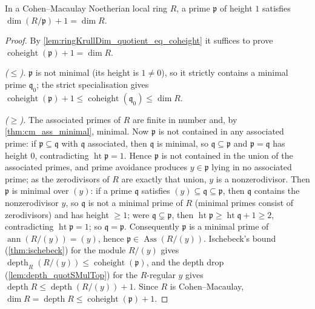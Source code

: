 \begin{theorem}
  \label{thm:cm_height_one}
  \leanok
  In a Cohen--Macaulay Noetherian local ring \(R\), a prime \(\mathfrak p\) of
  height \(1\) satisfies \(\dim(R/\mathfrak p) + 1 = \dim R\).
\end{theorem}
\begin{proof}
  \leanok
  By \ref{lem:ringKrullDim_quotient_eq_coheight} it suffices to prove
  \(\operatorname{coheight}(\mathfrak p) + 1 = \dim R\).

  \emph{(\(\le\)).} \(\mathfrak p\) is not minimal (its height is \(1 \neq 0\)),
  so it strictly contains a minimal prime \(\mathfrak q_0\); the strict
  specialisation gives \(\operatorname{coheight}(\mathfrak p) + 1 \le
  \operatorname{coheight}(\mathfrak q_0) \le \dim R\).

  \emph{(\(\ge\)).} The associated primes of \(R\) are finite in number and, by
  \ref{thm:cm_ass_minimal}, minimal. Now \(\mathfrak p\) is not contained in any
  associated prime: if \(\mathfrak p \subseteq \mathfrak q\) with \(\mathfrak q\)
  associated, then \(\mathfrak q\) is minimal, so \(\mathfrak q \subseteq
  \mathfrak p\) and \(\mathfrak p = \mathfrak q\) has height \(0\), contradicting
  \(\operatorname{ht} \mathfrak p = 1\). Hence \(\mathfrak p\) is not contained in
  the union of the associated primes, and prime avoidance produces
  \(y \in \mathfrak p\) lying in no associated prime; as the zerodivisors of
  \(R\) are exactly that union, \(y\) is a nonzerodivisor. Then \(\mathfrak p\)
  is minimal over \((y)\): if a prime \(\mathfrak q\) satisfies
  \((y) \subseteq \mathfrak q \subseteq \mathfrak p\), then \(\mathfrak q\)
  contains the nonzerodivisor \(y\), so \(\mathfrak q\) is not a minimal prime of
  \(R\) (minimal primes consist of zerodivisors) and has height \(\ge 1\); were
  \(\mathfrak q \subsetneq \mathfrak p\), then \(\operatorname{ht} \mathfrak p \ge
  \operatorname{ht} \mathfrak q + 1 \ge 2\), contradicting \(\operatorname{ht}
  \mathfrak p = 1\); so \(\mathfrak q = \mathfrak p\). Consequently
  \(\mathfrak p\) is a minimal prime of \(\operatorname{ann}(R/(y)) = (y)\), hence
  \(\mathfrak p \in \operatorname{Ass}(R/(y))\). Ischebeck's bound
  (\ref{thm:ischebeck}) for the module \(R/(y)\) gives
  \(\operatorname{depth}_R(R/(y)) \le \operatorname{coheight}(\mathfrak p)\), and
  the depth drop (\ref{lem:depth_quotSMulTop}) for the \(R\)-regular \(y\) gives
  \(\operatorname{depth} R \le \operatorname{depth}(R/(y)) + 1\). Since \(R\) is
  Cohen--Macaulay, \(\dim R = \operatorname{depth} R \le
  \operatorname{coheight}(\mathfrak p) + 1\).
\end{proof}

